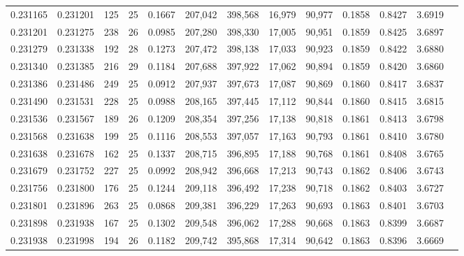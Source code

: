 \begin{tabular}{rrrrrrrrrrrrr}
0.231165 & 0.231201 &   125 &  25 &                                     0.1667 & 207,042 & 398,568 &  16,979 &  90,977 & 0.1858 & 0.8427 & 3.6919 \\
0.231201 & 0.231275 &   238 &  26 &                                     0.0985 & 207,280 & 398,330 &  17,005 &  90,951 & 0.1859 & 0.8425 & 3.6897 \\
0.231279 & 0.231338 &   192 &  28 &                                     0.1273 & 207,472 & 398,138 &  17,033 &  90,923 & 0.1859 & 0.8422 & 3.6880 \\
0.231340 & 0.231385 &   216 &  29 &                                     0.1184 & 207,688 & 397,922 &  17,062 &  90,894 & 0.1859 & 0.8420 & 3.6860 \\
0.231386 & 0.231486 &   249 &  25 &                                     0.0912 & 207,937 & 397,673 &  17,087 &  90,869 & 0.1860 & 0.8417 & 3.6837 \\
0.231490 & 0.231531 &   228 &  25 &                                     0.0988 & 208,165 & 397,445 &  17,112 &  90,844 & 0.1860 & 0.8415 & 3.6815 \\
0.231536 & 0.231567 &   189 &  26 &                                     0.1209 & 208,354 & 397,256 &  17,138 &  90,818 & 0.1861 & 0.8413 & 3.6798 \\
0.231568 & 0.231638 &   199 &  25 &                                     0.1116 & 208,553 & 397,057 &  17,163 &  90,793 & 0.1861 & 0.8410 & 3.6780 \\
0.231638 & 0.231678 &   162 &  25 &                                     0.1337 & 208,715 & 396,895 &  17,188 &  90,768 & 0.1861 & 0.8408 & 3.6765 \\
0.231679 & 0.231752 &   227 &  25 &                                     0.0992 & 208,942 & 396,668 &  17,213 &  90,743 & 0.1862 & 0.8406 & 3.6743 \\
0.231756 & 0.231800 &   176 &  25 &                                     0.1244 & 209,118 & 396,492 &  17,238 &  90,718 & 0.1862 & 0.8403 & 3.6727 \\
0.231801 & 0.231896 &   263 &  25 &                                     0.0868 & 209,381 & 396,229 &  17,263 &  90,693 & 0.1863 & 0.8401 & 3.6703 \\
0.231898 & 0.231938 &   167 &  25 &                                     0.1302 & 209,548 & 396,062 &  17,288 &  90,668 & 0.1863 & 0.8399 & 3.6687 \\
0.231938 & 0.231998 &   194 &  26 &                                     0.1182 & 209,742 & 395,868 &  17,314 &  90,642 & 0.1863 & 0.8396 & 3.6669 \\

\end{tabular}
